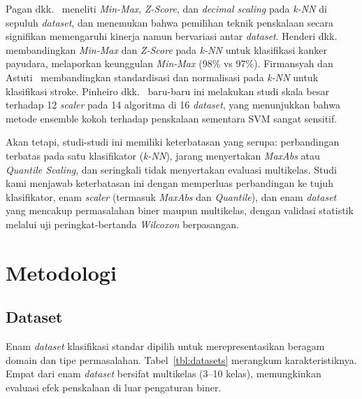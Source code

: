 \documentclass[12pt,a4paper]{article}
\begin{document}
Pagan dkk.~\cite{pagan2023scaling} meneliti \textit{Min-Max}, \textit{Z-Score},
dan \textit{decimal scaling} pada \textit{k-NN} di sepuluh \textit{dataset},
dan menemukan bahwa pemilihan teknik penskalaan secara signifikan memengaruhi
kinerja namun bervariasi antar \textit{dataset}. Henderi
dkk.~\cite{henderi2021minmax} membandingkan \textit{Min-Max} dan \textit{Z-Score}
pada \textit{k-NN} untuk klasifikasi kanker payudara, melaporkan keunggulan
\textit{Min-Max} (98\% vs 97\%). Firmansyah dan Astuti~\cite{firmansyah2024stroke}
membandingkan standardisasi dan normalisasi pada \textit{k-NN} untuk klasifikasi
stroke. Pinheiro dkk.~\cite{pinheiro2025scaling} baru-baru ini melakukan studi
skala besar terhadap 12 \textit{scaler} pada 14 algoritma di 16 \textit{dataset},
yang menunjukkan bahwa metode ensemble kokoh terhadap penskalaan sementara SVM
sangat sensitif.

Akan tetapi, studi-studi ini memiliki keterbatasan yang serupa: perbandingan
terbatas pada satu klasifikator (\textit{k-NN}), jarang menyertakan
\textit{MaxAbs} atau \textit{Quantile Scaling}, dan seringkali tidak menyertakan
evaluasi multikelas. Studi kami menjawab keterbatasan ini dengan memperluas
perbandingan ke tujuh klasifikator, enam \textit{scaler} (termasuk
\textit{MaxAbs} dan \textit{Quantile}), dan enam \textit{dataset} yang mencakup
permasalahan biner maupun multikelas, dengan validasi statistik melalui uji
peringkat-bertanda \textit{Wilcoxon} berpasangan.

\section{Metodologi}
\label{sec:method}

\subsection{Dataset}
\label{sec:datasets}

Enam \textit{dataset} klasifikasi standar dipilih untuk merepresentasikan
beragam domain dan tipe permasalahan. Tabel~\ref{tbl:datasets} merangkum
karakteristiknya. Empat dari enam \textit{dataset} bersifat multikelas
(3--10 kelas), memungkinkan evaluasi efek penskalaan di luar pengaturan biner.
\end{document}
